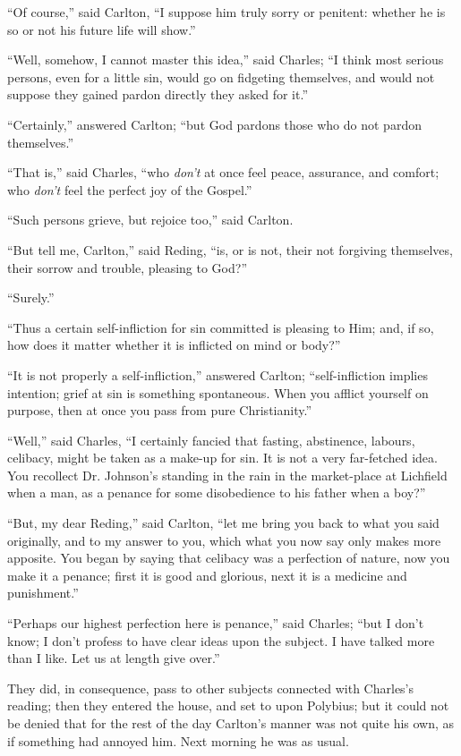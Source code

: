 ``Of course,'' said Carlton, ``I suppose him truly
sorry or penitent: whether he is so or not his future life will
show.''

``Well, somehow, I cannot master this idea,'' said Charles;
``I think most serious persons, even for a little sin, would go on
fidgeting themselves, and would not suppose they gained pardon
directly they asked for it.''

``Certainly,'' answered Carlton; ``but God pardons
those who do not pardon themselves.''

``That is,'' said Charles, ``who \emph{don't} at once
feel peace, assurance, and comfort; who \emph{don't} feel the perfect
joy of the Gospel.''

``Such persons grieve, but rejoice too,'' said Carlton.

``But tell me, Carlton,'' said Reding, ``is, or is not,
their not forgiving themselves, their sorrow and trouble, pleasing to
God?''

``Surely.''

``Thus a certain self-infliction for sin committed is pleasing
to Him; and, if so, how does it matter whether it is inflicted on mind
or body?''

``It is not properly a self-infliction,'' answered Carlton;
``self-infliction implies intention; grief at sin is something
spontaneous. When you afflict yourself on purpose, then at once you
pass from pure Christianity.''

``Well,'' said Charles, ``I certainly fancied that
fasting, abstinence, labours, celibacy, might be taken as a make-up
for sin. It is not a very far-fetched idea. You recollect Dr. Johnson's
standing in the rain in the market-place at Lichfield when a man, as a
penance for some disobedience to his father when a boy?''

``But, my dear Reding,'' said Carlton, ``let me bring
you back to what you said originally, and to my answer to you, which
what you now say only makes more apposite. You began by saying that
celibacy was a perfection of nature, now you make it a penance; first
it is good and glorious, next it is a medicine and punishment.''

``Perhaps our highest perfection here is penance,'' said
Charles; ``but I don't know; I don't profess to have clear
ideas upon the subject. I have talked more than I like. Let us at
length give over.''

They did, in consequence, pass to other subjects connected with
Charles's reading; then they entered the house, and set to upon
Polybius; but it could not be denied that for the rest of the day
Carlton's manner was not quite his own, as if something had annoyed
him. Next morning he was as usual.

